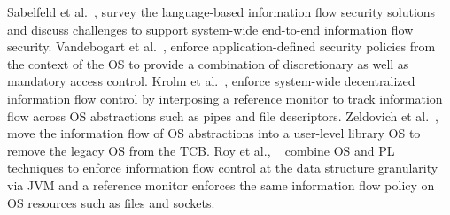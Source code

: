 Sabelfeld et al.~\citep{sabelfeld2003language}, survey the language-based information flow security solutions and discuss challenges to support system-wide end-to-end information flow security.
Vandebogart et al.~\citep{vandebogart+asbestos}, enforce
application-defined security policies from the context of the OS to provide a combination of discretionary as well as mandatory access control.
Krohn et  al.~\citep{krohn+flume}, enforce system-wide decentralized information flow control by interposing a reference monitor to track information flow across OS abstractions such as pipes and file descriptors.
Zeldovich et al.~\citep{zeldovich+histar}, move the information flow of OS abstractions into a user-level library OS to remove the legacy OS from the TCB.
Roy et al., ~\citep{roy2009laminar} combine OS and PL techniques to enforce information flow control at the data structure granularity via JVM and a reference monitor enforces the same 
information flow policy on OS resources such as files and sockets.




